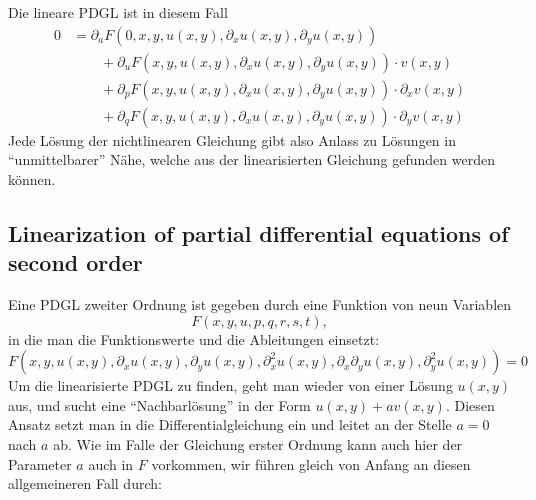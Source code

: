 Die lineare PDGL ist in diesem Fall
\begin{align*}
0
&=
\partial_aF(0,x,y,u(x,y),\partial_xu(x,y),\partial_yu(x,y))
\\
&\qquad
+
\partial_uF(x,y,u(x,y),\partial_xu(x,y),\partial_yu(x,y))\cdot v(x,y)
\\
&\qquad
+
\partial_pF(x,y,u(x,y),\partial_xu(x,y),\partial_yu(x,y))\cdot \partial_xv(x,y)
\\
&\qquad
+
\partial_qF(x,y,u(x,y),\partial_xu(x,y),\partial_yu(x,y))\cdot \partial_yv(x,y)
\end{align*}
Jede Lösung der nichtlinearen Gleichung gibt also Anlass zu Lösungen
in ``unmittelbarer'' Nähe, welche aus der linearisierten Gleichung
gefunden werden können.

\subsection{Linearization of partial differential equations of second order}
Eine PDGL zweiter Ordnung ist gegeben durch eine Funktion von neun
Variablen
\[
F(x,y,u,p,q,r,s,t),
\]
in die man die Funktionswerte und die Ableitungen einsetzt:
\[
F(x,y,u(x,y), \partial_xu(x,y),\partial_yu(x,y),
\partial_x^2u(x,y),
\partial_x\partial_yu(x,y),
\partial_y^2u(x,y))
=0
\]
Um die linearisierte PDGL zu finden, geht man wieder von einer
Lösung $u(x,y)$ aus, und sucht eine ``Nachbarlösung'' in der
Form $u(x,y)+av(x,y)$. Diesen Ansatz setzt man in die 
Differentialgleichung ein und leitet an der Stelle $a=0$
nach $a$ ab. Wie im Falle der Gleichung erster Ordnung kann auch
hier der Parameter $a$ auch in $F$ vorkommen, wir führen gleich
von Anfang an diesen allgemeineren Fall  durch:
